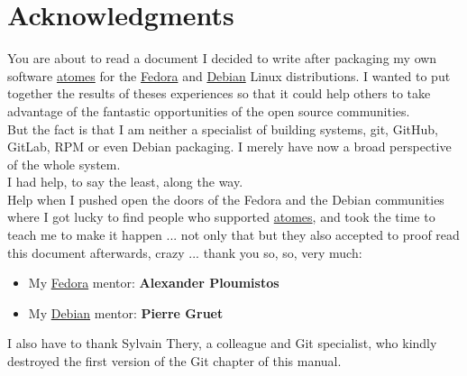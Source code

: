 \chapter*{Acknowledgments}

You are about to read a document I decided to write after packaging my own software \href{https://atomes.ipcms.fr}{atomes} for the \href{https://fedoraproject.org}{Fedora} and \href{https://www.debian.org}{Debian} Linux distributions. 
I wanted to put together the results of theses experiences so that it could help others to take advantage of the fantastic opportunities of the open source communities. \\[0.25cm]
But the fact is that I am neither a specialist of building systems, git, GitHub, GitLab, RPM or even Debian packaging. 
I merely have now a broad perspective of the whole system. \\[0.25cm]
I had help, to say the least, along the way. \\[0.25cm]
Help when I pushed open the doors of the Fedora and the Debian communities where I got lucky to find people who supported \href{https://atomes.ipcms.fr}{atomes}, 
and took the time to teach me to make it happen ... not only that but they also accepted to proof read this document afterwards, crazy ... thank you so, so, very much: 
\begin{itemize}
\item My \href{https://fedoraproject.org}{Fedora} mentor: {\bf{Alexander Ploumistos}}
\item My \href{https://www.debian.org}{Debian} mentor: {\bf{Pierre Gruet}}
\end{itemize}
I also have to thank Sylvain Thery, a colleague and Git specialist, who kindly destroyed the first version of the Git chapter of this manual. 

